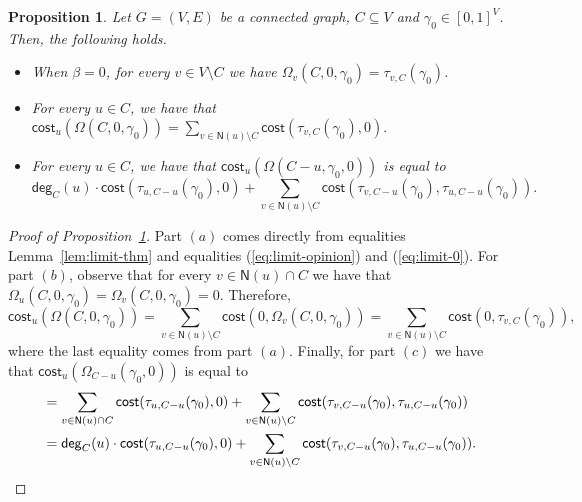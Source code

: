 \documentclass[letterpaper,11pt]{article}
\newcommand{\nsf}{\mathsf{N}}
\newcommand{\cost}{\mathsf{cost}}
\newcommand{\degsf}{\mathsf{deg}}
\newtheorem{proposition}{Proposition}
\begin{document}
\begin{proposition}
\label{prop:properties}
Let $G=(V,E)$ be a connected graph, $C\subseteq V$ and $\gamma_0\in [0,1]^V$.
Then, the following holds.
\begin{itemize}
	\item[$(a)$] When $\beta=0$, for every $v\in V\setminus C$ we have $\Omega_v(C,0,\gamma_0)=\tau_{v,C}(\gamma_0)$.
	\item[$(b)$]  For every $u\in C$, we have that 
 $\displaystyle \cost_u(\Omega(C,0,\gamma_0))=\sum_{v\in \nsf(u)\setminus C}\cost(\tau_{v,C}(\gamma_0),0).$
	\item[$(c)$]  For every $u\in C$, we have that $\cost_u(\Omega({C-u},\gamma_0,0))$ is equal to
\begin{equation*}
\degsf_C(u)\cdot \cost(\tau_{u,C-u}(\gamma_0),0)+\sum_{v\in \nsf(u)\setminus C}\cost(\tau_{v,C-u}(\gamma_0),\tau_{u,C-u}(\gamma_0)).
\end{equation*}
\end{itemize}
\end{proposition}

\begin{proof}[Proof of Proposition~\ref{prop:properties}]
Part $(a)$ comes directly from equalities Lemma~\ref{lem:limit-thm} and equalities (\ref{eq:limit-opinion}) and (\ref{eq:limit-0}).
For part $(b)$, observe that for every $v\in \nsf(u)\cap C$ we have that 
$\Omega_u(C,0,\gamma_0)=\Omega_v(C,0,\gamma_0)=0$.
Therefore,
\begin{equation*}
\cost_u(\Omega(C,0,\gamma_0))=\sum_{v\in \nsf(u)\setminus C}\cost(0,\Omega_v(C,0,\gamma_0))=\sum_{v\in \nsf(u)\setminus C}\cost(0,\tau_{v,C}(\gamma_0)),
\end{equation*}
where the last equality comes from part $(a)$.
Finally, for part $(c)$ 
we have that $\cost_u(\Omega_{C-u}(\gamma_0,0))$ is equal to 
\begin{align*}
&=\sum_{v\in \nsf(u)\cap C}\cost(\tau_{u,C-u}(\gamma_0),0)+\sum_{v\in \nsf(u)\setminus C}\cost(\tau_{v,C-u}(\gamma_0),\tau_{u,C-u}(\gamma_0))\\
&=\degsf_C(u)\cdot \cost(\tau_{u,C-u}(\gamma_0),0)+\sum_{v\in \nsf(u)\setminus C}\cost(\tau_{v,C-u}(\gamma_0),\tau_{u,C-u}(\gamma_0)).\qedhere
\end{align*}
\end{proof}
\end{document}
